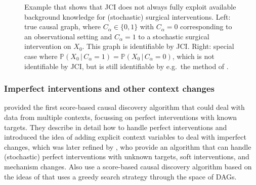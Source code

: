 \documentclass[twoside,11pt]{article}
\newcommand{\Prb}{\mathbb{P}}
\newcommand\given{\,|\,}
\begin{document}
\begin{figure}
  \centering
  \caption{Example that shows that JCI does not always fully exploit available background knowledge for (stochastic) surgical interventions. Left: true causal graph, where $C_\alpha \in \{0,1\}$ with $C_\alpha=0$ corresponding to an observational setting and $C_\alpha=1$ to a stochastic surgical intervention on $X_0$. This graph is identifiable by JCI. Right: special case where $\Prb(X_0 \given C_\alpha=1) = \Prb(X_0 \given C_\alpha=0)$, which is not identifiable by JCI, but is still identifiable by e.g.\ the method of \citet{HEJ2014}.\label{fig:JCI_incomplete_perfect_interventions}}
\end{figure}

\subsubsection{Imperfect interventions and other context changes}

\citet{CooperYoo1999} provided the first score-based causal discovery algorithm
that could deal with data from multiple contexts, focussing on perfect
interventions with known targets. They describe in detail how to handle perfect
interventions and introduced the idea of adding explicit context variables to
deal with imperfect changes, which was later refined by \citet{EatonMurphy07},
who provide an algorithm that can handle (stochastic) perfect interventions
with unknown targets, soft interventions, and mechanism changes. Also \citet{SPP05}
use a score-based causal discovery algorithm based on the ideas of
\citet{CooperYoo1999} that uses a greedy search strategy through the space of
DAGs. 
\end{document}
